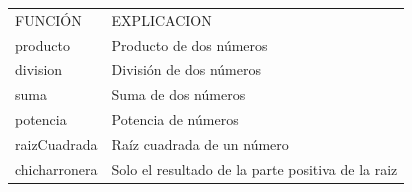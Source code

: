 \documentclass{report}
\begin{document}
\begin{longtable}[c]{@{}ll@{}}
\toprule
\begin{minipage}[t]{0.47\columnwidth}\raggedright\strut
{FUNCIÓN}
\strut\end{minipage} & \begin{minipage}[t]{0.47\columnwidth}\raggedright\strut
{EXPLICACION}
\strut\end{minipage}\tabularnewline
\begin{minipage}[t]{0.47\columnwidth}\raggedright\strut
{producto}
\strut\end{minipage} & \begin{minipage}[t]{0.47\columnwidth}\raggedright\strut
{Producto de dos números}
\strut\end{minipage}\tabularnewline
\begin{minipage}[t]{0.47\columnwidth}\raggedright\strut
{division}
\strut\end{minipage} & \begin{minipage}[t]{0.47\columnwidth}\raggedright\strut
{División de dos números}
\strut\end{minipage}\tabularnewline
\begin{minipage}[t]{0.47\columnwidth}\raggedright\strut
{suma}
\strut\end{minipage} & \begin{minipage}[t]{0.47\columnwidth}\raggedright\strut
{Suma de dos números}
\strut\end{minipage}\tabularnewline
\begin{minipage}[t]{0.47\columnwidth}\raggedright\strut
{potencia}
\strut\end{minipage} & \begin{minipage}[t]{0.47\columnwidth}\raggedright\strut
{Potencia de números }
\strut\end{minipage}\tabularnewline
\begin{minipage}[t]{0.47\columnwidth}\raggedright\strut
{raizCuadrada}
\strut\end{minipage} & \begin{minipage}[t]{0.47\columnwidth}\raggedright\strut
{Raíz cuadrada de un número}
\strut\end{minipage}\tabularnewline
\begin{minipage}[t]{0.47\columnwidth}\raggedright\strut
{chicharronera }
\strut\end{minipage} & \begin{minipage}[t]{0.47\columnwidth}\raggedright\strut
{Solo el resultado de la parte positiva de la raiz}
\strut\end{minipage}\tabularnewline

\end{longtable}
\end{document}
